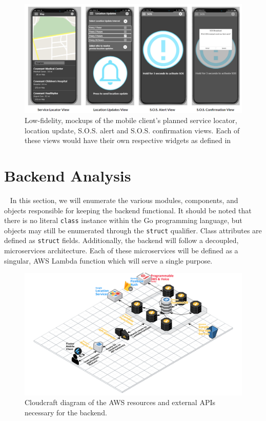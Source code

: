 \documentclass[10pt, a4paper]{article}
\begin{document}
\begin{figure}[H]
  \centerline{
  \includegraphics[width=\linewidth]{mockups.png}
  }
  \caption{Low-fidelity, mockups of the mobile client's planned service locator, location update, S.O.S. alert and S.O.S. confirmation views. Each of these views would have their own respective widgets as defined in }
\end{figure}


\section{Backend Analysis}
\par ~ In this section, we will enumerate the various modules, components, and objects responsible for keeping the backend functional. It should be noted that there is no literal \texttt{class} instance within the Go programming language, but objects may still be enumerated through the \texttt{struct} qualifier. Class attributes are defined as \texttt{struct} fields. Additionally, the backend will follow a decoupled, microservices architecture. Each of these microservices will be defined as a singular, AWS Lambda function which will serve a single purpose.

\begin{figure}[H]
\begin{center}
\centerline{
	\includegraphics[scale=.2]{EmergenSeek-Backend.PNG}
}
\caption{Cloudcraft \cite{one} diagram of the AWS resources and external APIs necessary for the backend.}
\end{center}	
\end{figure}
\end{document}
